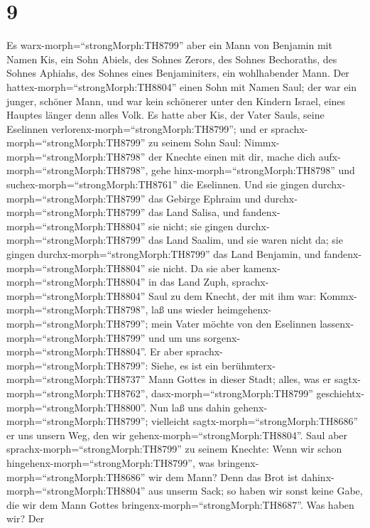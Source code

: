 \hypertarget{section-8}{%
\section{9}\label{section-8}}

 Es warx-morph=``strongMorph:TH8799'' aber ein Mann von
Benjamin mit Namen Kis, ein Sohn Abiels, des Sohnes Zerors, des Sohnes
Bechoraths, des Sohnes Aphiahs, des Sohnes eines Benjaminiters, ein
wohlhabender Mann.  Der hattex-morph=``strongMorph:TH8804''
einen Sohn mit Namen Saul; der war ein junger, schöner Mann, und war
kein schönerer unter den Kindern Israel, eines Hauptes länger denn alles
Volk.  Es hatte aber Kis, der Vater Sauls, seine Eselinnen
verlorenx-morph=``strongMorph:TH8799''; und er
sprachx-morph=``strongMorph:TH8799'' zu seinem Sohn Saul:
Nimmx-morph=``strongMorph:TH8798'' der Knechte einen mit dir, mache dich
aufx-morph=``strongMorph:TH8798'', gehe
hinx-morph=``strongMorph:TH8798'' und
suchex-morph=``strongMorph:TH8761'' die Eselinnen.  Und sie
gingen durchx-morph=``strongMorph:TH8799'' das Gebirge Ephraim und
durchx-morph=``strongMorph:TH8799'' das Land Salisa, und
fandenx-morph=``strongMorph:TH8804'' sie nicht; sie gingen
durchx-morph=``strongMorph:TH8799'' das Land Saalim, und sie waren nicht
da; sie gingen durchx-morph=``strongMorph:TH8799'' das Land Benjamin,
und fandenx-morph=``strongMorph:TH8804'' sie nicht.  Da sie
aber kamenx-morph=``strongMorph:TH8804'' in das Land Zuph,
sprachx-morph=``strongMorph:TH8804'' Saul zu dem Knecht, der mit ihm
war: Kommx-morph=``strongMorph:TH8798'', laß uns wieder
heimgehenx-morph=``strongMorph:TH8799''; mein Vater möchte von den
Eselinnen lassenx-morph=``strongMorph:TH8799'' und um uns
sorgenx-morph=``strongMorph:TH8804''.  Er aber
sprachx-morph=``strongMorph:TH8799'': Siehe, es ist ein
berühmterx-morph=``strongMorph:TH8737'' Mann Gottes in dieser Stadt;
alles, was er sagtx-morph=``strongMorph:TH8762'',
dasx-morph=``strongMorph:TH8799''
geschiehtx-morph=``strongMorph:TH8800''. Nun laß uns dahin
gehenx-morph=``strongMorph:TH8799''; vielleicht
sagtx-morph=``strongMorph:TH8686'' er uns unsern Weg, den wir
gehenx-morph=``strongMorph:TH8804''.  Saul aber
sprachx-morph=``strongMorph:TH8799'' zu seinem Knechte: Wenn wir schon
hingehenx-morph=``strongMorph:TH8799'', was
bringenx-morph=``strongMorph:TH8686'' wir dem Mann? Denn das Brot ist
dahinx-morph=``strongMorph:TH8804'' aus unserm Sack; so haben wir sonst
keine Gabe, die wir dem Mann Gottes
bringenx-morph=``strongMorph:TH8687''. Was haben wir?  Der
